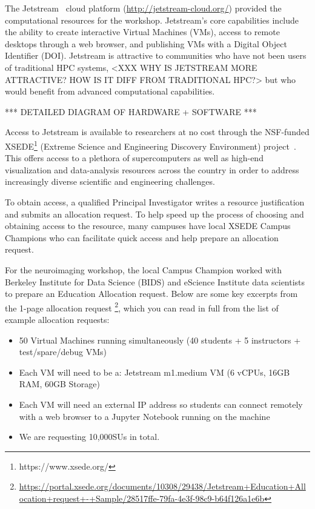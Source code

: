 The Jetstream~\cite{Stewart2015Jetstream} cloud platform (\url{http://jetstream-cloud.org/}) provided the
computational resources for the workshop. Jetstream's core capabilities include
the ability to create interactive Virtual Machines (VMs), access to remote
desktops through a web browser, and publishing VMs with a Digital Object
Identifier (DOI). Jetstream is
attractive to communities who have not been users of traditional HPC systems,
<XXX WHY IS JETSTREAM MORE ATTRACTIVE? HOW IS IT DIFF FROM TRADITIONAL HPC?>
but who would benefit from advanced computational capabilities.

*** DETAILED DIAGRAM OF HARDWARE + SOFTWARE ***

Access to Jetstream is available to researchers at no cost through the
NSF-funded XSEDE\footnote{https://www.xsede.org/} (Extreme Science and
Engineering Discovery Environment) project~\cite{Towns2014XSEDE}. This
offers access to a plethora of supercomputers as well as high-end
visualization and data-analysis resources across the
country in order to address increasingly diverse scientific and
engineering challenges.

To obtain access, a qualified Principal Investigator writes a resource
justification and submits an allocation request. To help speed up the
process of choosing and obtaining access to the resource, many campuses
have local XSEDE Campus Champions who can facilitate quick access and
help prepare an allocation request.

For the neuroimaging workshop, the local Campus Champion worked with Berkeley
Institute for Data Science (BIDS) and eScience Institute data scientists to
prepare an Education Allocation request. Below are some key excerpts from the
1-page allocation request \footnote{\url{https://portal.xsede.org/documents/10308/29438/Jetstream+Education+Allocation+request+-+Sample/28517ffe-79fa-4e3f-98c9-b64f126a1e6b}},
which you can read in full from the list of example allocation requests:

\begin{itemize}
\item 50 Virtual Machines running simultaneously (40 students + 5 instructors +
test/spare/debug VMs)
\item Each VM will need to be a: Jetstream m1.medium VM (6 vCPUs, 16GB RAM, 60GB
  Storage)
\item Each VM will need an external IP address so students can connect remotely
  with a web browser to a Jupyter Notebook running on the machine
\item We are requesting 10,000SUs in total.
\end{itemize}

